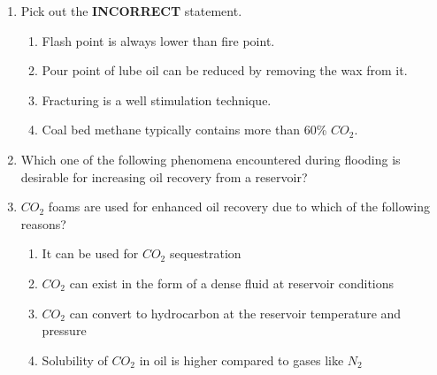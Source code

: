 \documentclass[journal,12pt,onecolumn]{IEEEtran}
\theoremstyle{remark}
\begin{document}
\begin{enumerate}
\item Pick out the \textbf{INCORRECT} statement.

\hfill{}

\begin{enumerate}
\item Flash point is always lower than fire point.
\item Pour point of lube oil can be reduced by removing the wax from it.
\item Fracturing is a well stimulation technique.
\item Coal bed methane typically contains more than 60\% $CO_2$.
\end{enumerate}

\item Which one of the following phenomena encountered during flooding is desirable for
increasing oil recovery from a reservoir?

\hfill{}

\begin{enumerate}
\end{enumerate}

\item $CO_2$ foams are used for enhanced oil recovery due to which of the following reasons?

\hfill{}

\begin{enumerate}
\item It can be used for $CO_2$ sequestration
\item $CO_2$ can exist in the form of a dense fluid at reservoir conditions
\item $CO_2$ can convert to hydrocarbon at the reservoir temperature and pressure
\item Solubility of $CO_2$ in oil is higher compared to gases like $N_2$
\end{enumerate}

\begin{enumerate}
\end{enumerate}


\end{enumerate}
\end{document}
